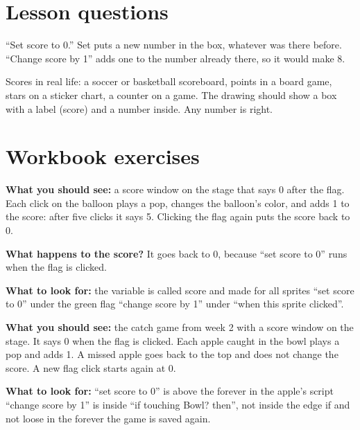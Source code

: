 
\section{Lesson questions}
\begin{answer}
\enquote{Set score to 0.} Set puts a new number in the box, whatever was there before. \enquote{Change score by 1} adds one to the number already there, so it would make 8.
\end{answer}

\begin{answer}[Reflection]
Scores in real life: a soccer or basketball scoreboard, points in a board game, stars on a sticker chart, a counter on a game. The drawing should show a box with a label (score) and a number inside. Any number is right.
\end{answer}

\section{Workbook exercises}
\begin{answer}
\textbf{What you should see:} a score window on the stage that says 0 after the flag. Each click on the balloon plays a pop, changes the balloon's color, and adds 1 to the score: after five clicks it says 5. Clicking the flag again puts the score back to 0.

\textbf{What happens to the score?} It goes back to 0, because \enquote{set score to 0} runs when the flag is clicked.

\textbf{What to look for:} \tickbox{} the variable is called score and made for all sprites \quad \tickbox{} \enquote{set score to 0} under the green flag \quad \tickbox{} \enquote{change score by 1} under \enquote{when this sprite clicked}.
\end{answer}

\begin{answer}
\textbf{What you should see:} the catch game from week 2 with a score window on the stage. It says 0 when the flag is clicked. Each apple caught in the bowl plays a pop and adds 1. A missed apple goes back to the top and does not change the score. A new flag click starts again at 0.

\textbf{What to look for:} \tickbox{} \enquote{set score to 0} is above the forever in the apple's script \quad \tickbox{} \enquote{change score by 1} is inside \enquote{if touching Bowl? then}, not inside the edge if and not loose in the forever \quad \tickbox{} the game is saved again.
\end{answer}

